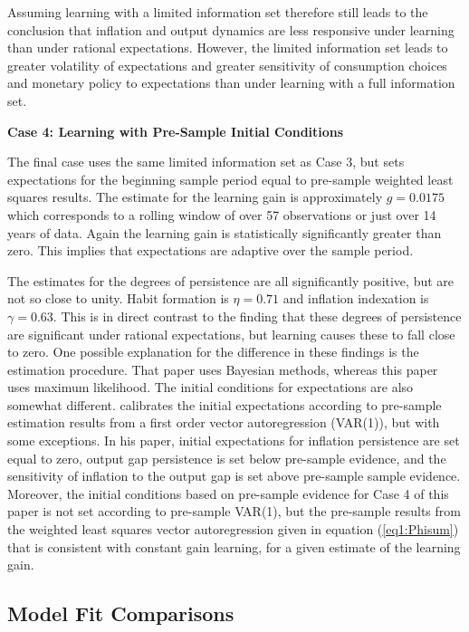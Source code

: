 Assuming learning with a limited information set therefore still leads to the conclusion that inflation and output dynamics are less responsive under learning than under rational expectations.  However, the limited information set leads to greater volatility of expectations and greater sensitivity of consumption choices and monetary policy to expectations than under learning with a full information set.

\noindent \textbf{Case 4:  Learning with Pre-Sample Initial Conditions} 

The final case uses the same limited information set as Case 3, but sets expectations for the beginning sample period equal to pre-sample weighted least squares results.  The estimate for the learning gain is approximately $g=0.0175$ which corresponds to a rolling window of over 57 observations or just over 14 years of data.  Again the learning gain is statistically significantly greater than zero.  This implies that expectations are adaptive over the sample period.  

The estimates for the degrees of persistence are all significantly positive, but are not so close to unity.  Habit formation is $\eta=0.71$ and inflation indexation is $\gamma=0.63$.  This is in direct contrast to the  finding that these degrees of persistence are significant under rational expectations, but learning causes these to fall close to zero.  One possible explanation for the difference in these findings is the estimation procedure.  That paper uses Bayesian methods, whereas this paper uses maximum likelihood.  The initial conditions for expectations are also somewhat different.   calibrates the initial expectations according to pre-sample estimation results from a first order vector autoregression (VAR(1)), but with some exceptions.  In his paper, initial expectations for inflation persistence are set equal to zero, output gap persistence is set below pre-sample evidence, and the sensitivity of inflation to the output gap is set above pre-sample sample evidence.  Moreover, the initial conditions based on pre-sample evidence for Case 4 of this paper is not set according to pre-sample VAR(1), but the pre-sample results from the weighted least squares vector autoregression given in equation (\ref{eq1:Phisum}) that is consistent with constant gain learning, for a given estimate of the learning gain.

\subsection{Model Fit Comparisons}

